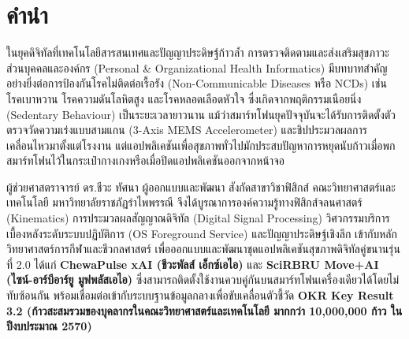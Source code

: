 \chapter*{คำนำ}

ในยุคดิจิทัลที่เทคโนโลยีสารสนเทศและปัญญาประดิษฐ์ก้าวล้ำ การตรวจติดตามและส่งเสริมสุขภาวะส่วนบุคคลและองค์กร (Personal \& Organizational Health Informatics) มีบทบาทสำคัญอย่างยิ่งต่อการป้องกันโรคไม่ติดต่อเรื้อรัง (Non-Communicable Diseases หรือ NCDs) เช่น โรคเบาหวาน โรคความดันโลหิตสูง และโรคหลอดเลือดหัวใจ ซึ่งเกิดจากพฤติกรรมเนือยนิ่ง (Sedentary Behaviour) เป็นระยะเวลายาวนาน แม้ว่าสมาร์ทโฟนยุคปัจจุบันจะได้รับการติดตั้งตัวตรวจวัดความเร่งแบบสามแกน (3-Axis MEMS Accelerometer) และชิปประมวลผลการเคลื่อนไหวมาตั้งแต่โรงงาน แต่แอปพลิเคชันเพื่อสุขภาพทั่วไปมักประสบปัญหาการหยุดนับก้าวเมื่อพกสมาร์ทโฟนไว้ในกระเป๋ากางเกงหรือเมื่อปิดแอปพลิเคชันออกจากหน้าจอ

ผู้ช่วยศาสตราจารย์ ดร.ชีวะ ทัศนา ผู้ออกแบบและพัฒนา สังกัดสาขาวิชาฟิสิกส์ คณะวิทยาศาสตร์และเทคโนโลยี มหาวิทยาลัยราชภัฏรำไพพรรณี จึงได้บูรณาการองค์ความรู้ทางฟิสิกส์จลนศาสตร์ (Kinematics) การประมวลผลสัญญาณดิจิทัล (Digital Signal Processing) วิศวกรรมบริการเบื้องหลังระดับระบบปฏิบัติการ (OS Foreground Service) และปัญญาประดิษฐ์เชิงลึก เข้ากับหลักวิทยาศาสตร์การกีฬาและชีวกลศาสตร์ เพื่อออกแบบและพัฒนาชุดแอปพลิเคชันสุขภาพดิจิทัลคู่ขนานรุ่นที่ 2.0 ได้แก่ \textbf{ChewaPulse xAI (ชีวะพัลส์ เอ็กซ์เอไอ)} และ \textbf{SciRBRU Move+AI (ไซน์-อาร์บีอาร์ยู มูฟพลัสเอไอ)} ซึ่งสามารถติดตั้งใช้งานควบคู่กันบนสมาร์ทโฟนเครื่องเดียวได้โดยไม่ทับซ้อนกัน พร้อมเชื่อมต่อเข้ากับระบบฐานข้อมูลกลางเพื่อขับเคลื่อนตัวชี้วัด \textbf{OKR Key Result 3.2 (ก้าวสะสมรวมของบุคลากรในคณะวิทยาศาสตร์และเทคโนโลยี มากกว่า 10,000,000 ก้าว ในปีงบประมาณ 2570)}

